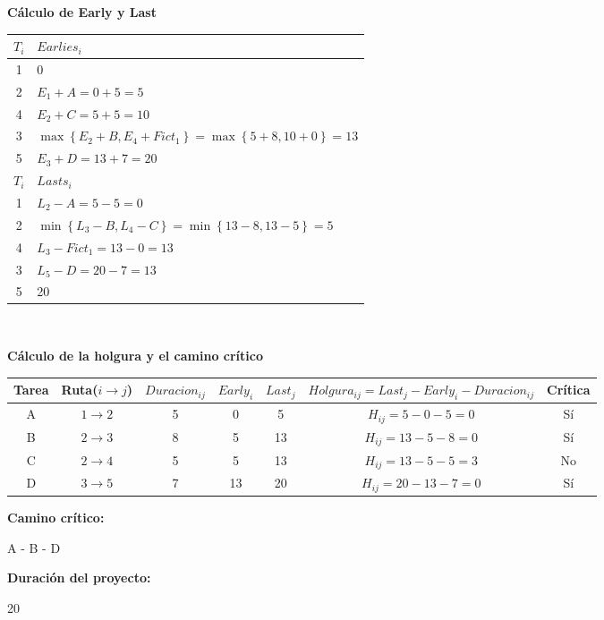 \documentclass{llncs}
\begin{document}
\vspace{0.5cm}

\textbf{Cálculo de Early y Last}
\begin{table}
\label{tab:tabla2}
\centering
\begin{tabular}{C|l}
\toprule
$T_i$ & $Earlies_i$ \\
 & 0 \\
 & $E_1 + A = 0 + 5 = 5$ \\
 & $E_2 + C = 5 + 5 = 10$ \\
 & $\max \left\{ E_2 + B, E_4 + Fict_1 \right\} = \max \left\{ 5 + 8, 10 + 0 \right\} = 13$ \\
 & $E_3 + D = 13 + 7 = 20$ \\
\bottomrule
\toprule
$T_i$ & $Lasts_i$ \\
 & $L_2 - A = 5 - 5 = 0$ \\
 & $\min \left\{ L_3 - B, L_4 - C \right\} = \min \left\{ 13 - 8, 13 - 5 \right\} = 5$ \\
 & $L_3 - Fict_1 = 13 - 0 = 13$ \\
 & $L_5 - D = 20 - 7 = 13$ \\
 & 20 \\
\bottomrule
\end{tabular}
\end{table} \\

\newpage

\textbf{Cálculo de la holgura y el camino crítico}
\begin{table}
\label{tab:tabla3}
\centering
\begin{tabular}{C|CCCCcC}
\toprule
Tarea & Ruta($i \rightarrow j$) & $Duracion_{ij}$ & $Early_i$ & $Last_j$ & $Holgura_{ij} = Last_j - Early_i - Duracion_{ij}$ & Crítica \\
\midrule
A & $1 \rightarrow 2$ & 5 & 0 & 5 & $H_{ij} = 5 - 0 - 5 = 0$ & Sí \\
B & $2 \rightarrow 3$ & 8 & 5 & 13 & $H_{ij} = 13 - 5 - 8 = 0$ & Sí \\
C & $2 \rightarrow 4$ & 5 & 5 & 13 & $H_{ij} = 13 - 5 - 5 = 3$ & No \\
D & $3 \rightarrow 5$ & 7 & 13 & 20 & $H_{ij} = 20 - 13 - 7 = 0$ & Sí \\
\bottomrule
\end{tabular}
\end{table}

\begin{multicols}{2}
\textbf{Camino crítico:}

A - B - D

\textbf{Duración del proyecto:}

20
\end{multicols}
\end{document}
